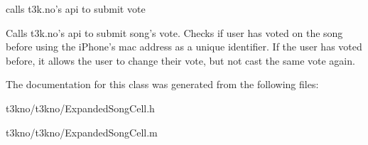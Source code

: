 calls t3k.\-no's api to submit vote 

Calls t3k.\-no's api to submit song's vote. Checks if user has voted on the song before using the i\-Phone's mac address as a unique identifier. If the user has voted before, it allows the user to change their vote, but not cast the same vote again. 

The documentation for this class was generated from the following files\-:\begin{DoxyCompactItemize}
\item 
t3kno/t3kno/Expanded\-Song\-Cell.\-h\item 
t3kno/t3kno/Expanded\-Song\-Cell.\-m\end{DoxyCompactItemize}
